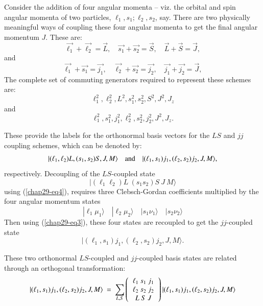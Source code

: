 Consider the addition of four angular momenta -- viz. the orbital and spin angular momenta of two particles, $\ell_1, s_1; \ell_2, s_2$, say. There are two physically meaningful ways of coupling these four angular momenta to get the final angular momentum $J$. These are:
\begin{equation}
\vec{\ell_1}+\vec{\ell_2} = \vec{L},\quad \vec{s_1}+\vec{s_2} = \vec{S},\quad \vec{L}+\vec{S} = \vec{J},\label{chap29-eq44}
\end{equation}
and 
\begin{equation}
\vec{\ell_1}+\vec{s_1} = \vec{j_1},\quad \vec{\ell_2}+\vec{s_2} = \vec{j_2},\quad \vec{j_1}+\vec{j_2} = \vec{J},\label{chap29-eq45}
\end{equation}
The complete set of commuting generators required to represent these schemes are:
\begin{equation}
\ell_1^2, \ell_2^2, L^2, s_1^2, s_2^2, S^2, J^2, J_z \label{chap29-eq46}
\end{equation}
and
\begin{equation}
\ell_1^2, s_1^2, j_1^2, \ell_2^2, s_2^2, j_2^2, J^2, J_z. \label{chap29-eq47}
\end{equation}

These provide the labels for the orthonormal basis vectors for the $LS$ and $jj$ coupling schemes, which can be denoted by:
\begin{equation}
|(\ell_1, \ell_2) L, (s_1, s_2) S, J, M\rangle \quad {\rm and} \quad |(\ell_1, s_1) j_1, (\ell_2, s_2) j_2, J, M\rangle ,\label{chap29-eq48}
\end{equation}
respectively. Decoupling  of the $LS$-coupled state
\begin{equation*}
|(\ell_1 \ell_2) L\ (s_1 s_2) S\ J\ M \rangle \label{chap29-eq48a}
\end{equation*}
using (\eqref{chap29-eq4}), requires three Clebsch-Gordan coefficients multiplied by the four angular momentum states
\begin{equation}
|\ell_1 \mu_1 \rangle \quad |\ell_2 \mu_2 \rangle \quad |s_1 \nu_1 \rangle \quad  |s_2 \nu_2 \rangle \label{chap29-eq49}
\end{equation}
Then using (\eqref{chap29-eq3}), these four states are recoupled to get the $jj$-coupled state  
\begin{equation*}
|(\ell_1, s_1) j_1, (\ell_2, s_2) j_2, J, M\rangle.\label{chap29-eq48b}
\end{equation*}

These two orthonormal $LS$-coupled and $jj$-coupled basis states are related through an orthogonal transformation:
\begin{equation}
|(\ell_1, s_1) j_1, (\ell_2, s_2) j_2, J, M\rangle \ =\ 
\sum_{L,S} 
\left(
\begin{tabular}{c}
$\ell_1 \ s_1 \ j_1$\\   
$\ell_2 \ s_2 \ j_2$\\ 
$L \ S \ J$\\ 
\end{tabular}
\right)
|(\ell_1, s_1) j_1, (\ell_2, s_2) j_2, J, M\rangle  \label{chap29-eq50}
\end{equation}

